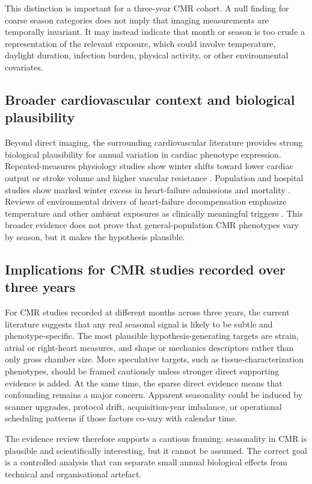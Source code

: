 This distinction is important for a three-year CMR cohort. A null finding for coarse season categories does not imply that imaging measurements are temporally invariant. It may instead indicate that month or season is too crude a representation of the relevant exposure, which could involve temperature, daylight duration, infection burden, physical activity, or other environmental covariates.

\subsection*{Broader cardiovascular context and biological plausibility}

Beyond direct imaging, the surrounding cardiovascular literature provides strong biological plausibility for annual variation in cardiac phenotype expression. Repeated-measures physiology studies show winter shifts toward lower cardiac output or stroke volume and higher vascular resistance \cite{Radke2010}. Population and hospital studies show marked winter excess in heart-failure admissions and mortality \cite{Boulay1999,Gallerani2011}. Reviews of environmental drivers of heart-failure decompensation emphasize temperature and other ambient exposures as clinically meaningful triggers \cite{Mete2019,Bhatia2017}. This broader evidence does not prove that general-population CMR phenotypes vary by season, but it makes the hypothesis plausible.

\subsection*{Implications for CMR studies recorded over three years}

For CMR studies recorded at different months across three years, the current literature suggests that any real seasonal signal is likely to be subtle and phenotype-specific. The most plausible hypothesis-generating targets are strain, atrial or right-heart measures, and shape or mechanics descriptors rather than only gross chamber size. More speculative targets, such as tissue-characterization phenotypes, should be framed cautiously unless stronger direct supporting evidence is added. At the same time, the sparse direct evidence means that confounding remains a major concern. Apparent seasonality could be induced by scanner upgrades, protocol drift, acquisition-year imbalance, or operational scheduling patterns if those factors co-vary with calendar time.

The evidence review therefore supports a cautious framing: seasonality in CMR is plausible and scientifically interesting, but it cannot be assumed. The correct goal is a controlled analysis that can separate small annual biological effects from technical and organisational artefact.
